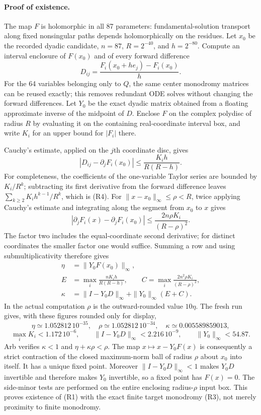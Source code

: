 \paragraph{Proof of existence.}
The map $F$ is holomorphic in all 87 parameters: fundamental-solution
transport along fixed nonsingular paths depends holomorphically on
the residues. Let $x_0$ be the recorded dyadic candidate, $n=87$,
$R=2^{-40}$, and $h=2^{-80}$. Compute an interval enclosure of
$F(x_0)$ and of every forward difference
\[
D_{ij}=\frac{F_i(x_0+he_j)-F_i(x_0)}h.
\]
For the 64 variables belonging only to $Q$, the same center monodromy
matrices can be reused exactly; this removes redundant ODE solves
without changing the forward differences. Let $Y_0$ be the exact
dyadic matrix obtained from a floating approximate inverse of the
midpoint of $D$. Enclose $F$ on the complex polydisc of radius $R$
by evaluating it on the containing real-coordinate interval box,
and write $K_i$ for an upper bound for $|F_i|$ there.

Cauchy's estimate, applied on the $j$th coordinate disc, gives
\[
|D_{ij}-\partial_jF_i(x_0)|
 \le\frac{K_i h}{R(R-h)}.
\tag{R4}
\]
For completeness, the coefficients of the one-variable Taylor
series are bounded by $K_i/R^k$; subtracting its first derivative
from the forward difference leaves
$\sum_{k\ge2}K_i h^{k-1}/R^k$, which is (R4).
For $\|x-x_0\|_\infty\le\rho<R$, twice applying Cauchy's estimate
and integrating along the segment from $x_0$ to $x$ gives
\[
|\partial_jF_i(x)-\partial_jF_i(x_0)|
 \le\frac{2n\rho K_i}{(R-\rho)^2}.
\tag{R5}
\]
The factor two includes the equal-coordinate second derivative;
for distinct coordinates the smaller factor one would suffice.
Summing a row and using submultiplicativity therefore gives
\[
\begin{split}
\eta&=\|Y_0F(x_0)\|_\infty,\\
E&=\max_i\frac{nK_i h}{R(R-h)},\qquad
C=\max_i\frac{2n^2\rho K_i}{(R-\rho)^2},\\
\kappa&=\|I-Y_0D\|_\infty+\|Y_0\|_\infty(E+C).
\end{split}
\tag{R6}
\]
In the actual computation $\rho$ is the outward-rounded value
$10\eta$. The fresh run gives, with these figures rounded only for
display,
\[
\eta\simeq1.052812\,10^{-35},\quad
\rho\simeq1.052812\,10^{-34},\quad
\kappa\simeq0.005589859013,
\]
\[
\max_i K_i<1.172\,10^{-6},\qquad
\|I-Y_0D\|_\infty<2.216\,10^{-9},\qquad
\|Y_0\|_\infty<54.87.
\]
Arb verifies $\kappa<1$ and $\eta+\kappa\rho<\rho$.
The map $x\mapsto x-Y_0F(x)$ is consequently a strict contraction
of the closed maximum-norm ball of radius $\rho$ about $x_0$ into
itself. It has a unique fixed point. Moreover
$\|I-Y_0D\|_\infty<1$ makes $Y_0D$ invertible and therefore makes
$Y_0$ invertible, so a fixed point has $F(x)=0$. The side-minor tests
are performed on the entire enclosing radius-$\rho$ input box.
This proves existence of (R1) with the exact finite target monodromy
(R3), not merely proximity to finite monodromy.

